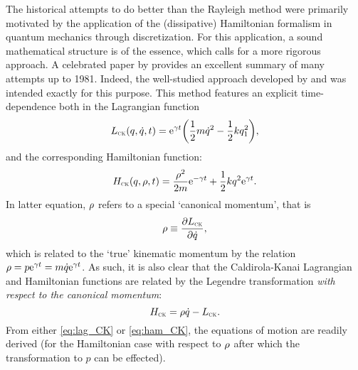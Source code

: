 The historical attempts to do better than the Rayleigh method were primarily motivated by the application of the (dissipative) Hamiltonian formalism in quantum mechanics through discretization. For this application, a sound mathematical structure is of the essence, which calls for a more rigorous approach. A celebrated paper by
\citet{Dekker1981} provides an excellent summary of many attempts up to 1981. Indeed, the well-studied approach developed by \citet{Caldirola1941} and \citet{Kanai1948} was intended exactly for this purpose. This method features an explicit time-dependence both in the Lagrangian function
\begin{equation}
    L_\text{\tiny{\textsc{CK}}}(q, \dot{q}, t) = \mathrm{e}^{\gamma t}\qty(\frac{1}{2}m\dot{q}^2 - \frac{1}{2}kq_1^2),
    \label{eq:lag_CK}
\end{equation}
and the corresponding Hamiltonian function:
\begin{equation}
    H_\text{\tiny{\textsc{CK}}}(q, \rho, t) = \frac{\rho^2}{2m}\mathrm{e}^{-\gamma t} + \frac{1}{2}kq^2\mathrm{e}^{\gamma t}.
    \label{eq:ham_CK}
\end{equation}
In latter equation, $\rho$ refers to a special `canonical momentum', that is
\begin{equation}
    \rho \equiv \pdv{\ensuremath{L_\text{\tiny{\textsc{CK}}}}}{\dot{q}},
    \label{eq:can_momentum}
\end{equation}
which is related to the `true' kinematic momentum by the relation $\rho = p\mathrm{e}^{\gamma
t} = m\dot{q}\mathrm{e}^{\gamma t}$. As such, it is also clear that the Caldirola-Kanai Lagrangian and Hamiltonian functions are related by the Legendre transformation \emph{with respect to the canonical momentum}:
$$ H_\text{\tiny{\textsc{CK}}} = \rho \dot{q} - L_\text{\tiny{\textsc{CK}}}. $$
From either \cref{eq:lag_CK} or \cref{eq:ham_CK}, the equations of motion are readily
derived (for the Hamiltonian case with respect to $\rho$ after which the transformation to $p$ can be effected).
